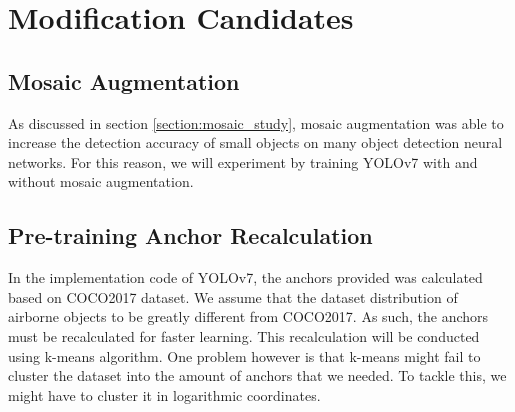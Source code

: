\section{Modification Candidates}
\label{section:modificationcandidates}
  \subsection{Mosaic Augmentation}
  As discussed in section \ref{section:mosaic_study}, mosaic augmentation was able to increase the detection accuracy of small objects
  on many object detection neural networks. For this reason, we will experiment by training YOLOv7 with and without  mosaic augmentation.
  \subsection{Pre-training Anchor Recalculation}

  In the implementation code of YOLOv7, the anchors provided was calculated based on COCO2017 dataset.
  We assume that the dataset distribution of airborne objects to be greatly different from COCO2017.
  As such, the anchors must be recalculated for faster learning. This recalculation will be conducted
  using k-means algorithm. One problem however is that k-means might fail to cluster the dataset into 
  the amount of anchors that we needed. To tackle this, we might have to cluster it in logarithmic coordinates. 

